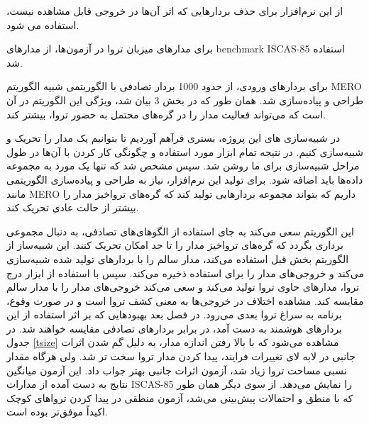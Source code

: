 از این نرم‌افزار برای حذف بردارهایی که اثر آن‌ها در خروجی قابل مشاهده نیست، استفاده می شود.

برای مدارهای میزبان تروا در آزمون‌ها، از مدارهای benchmark ISCAS-85 استفاده شد. 


 برای بردارهای ورودی، از حدود 1000 بردار تصادفی با الگوریتمی شبیه الگوریتم MERO طراحی و پیاده‌سازی شد. همان طور که در بخش 3 بیان شد، ویژگی این الگوریتم در آن است که می‌تواند فعالیت مدار را در گره‌های محتمل به حضور تروا، بیشتر کند.

در شبیه‌سازی های این پروژه، بستری فرآهم آوردیم تا بتوانیم یک مدار را تحریک و شبیه‌سازی کنیم. در نتیجه تمام ابزار مورد استفاده و چگونگی کار کردن با آن‌ها در طول مراحل شبیه‌سازی برای ما روشن شد. سپس مشخص شد که تنها یک مورد به مجموعه داده‌ها باید اضافه شود. برای تولید این نرم‌افزار، نیاز به  طراحی و پیاده‌سازی الگوریتمی مانند MERO داریم که بتواند مجموعه بردارهایی تولید کند که گره‌های تروا‌خیز مدار را بیشتر از حالت عادی تحریک کند.


این الگوریتم سعی می‌کند به جای استفاده از الگوهای‌های تصادفی، به دنبال مجموعی برداری بگردد که گره‌های تروا‌خیز مدار را تا حد امکان تحریک کنند.
این شبیه‌ساز از الگوریتم بخش قبل استفاده می‌کند، مدار سالم را با بردارهای تولید شده شبیه‌سازی می‌کند و خروجی‌های مدار را برای استفاده ذخیره می‌کند. سپس با استفاده از ابزار درج تروا، مدارهای حاوی تروا تولید می‌کند و سعی می‌کند خروجی‌های مدار را با مدار سالم مقایسه کند. مشاهده اختلاف در خروجی‌ها به معنی کشف تروا است و در صورت وقوع، برنامه به سراغ تروا بعدی می‌رود. در فصل بعد بهبودهایی که بر اثر استفاده از این بردارهای هوشمند به دست آمد، در برابر بردارهای تصادفی مقایسه خواهند شد.
در جدول \ref{tsize} مشاهده می‌شود که با بالا رفتن اندازه مدار، به دلیل گم شدن اثرات جانبی در لابه لای تغییرات فرایند، پیدا کردن مدار تروا سخت تر شد. ولی هرگاه مقدار نسبی مساحت تروا زیاد شد، آزمون اثرات جانبی بهتر جواب داد. این آزمون میانگین نتایج به دست آمده از مدارات ISCAS-85 را نمایش می‌دهد. از سوی دیگر همان طور که با منطق و احتمالات پیش‌بینی می‌شد، آزمون منطقی در پیدا کردن تروا‌های کوچک اکیداً موفق‌تر بوده است.

